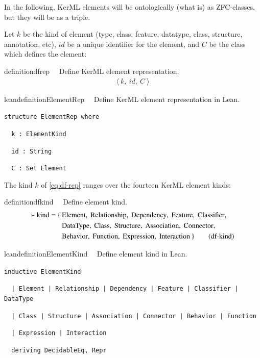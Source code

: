\pn In the following, KerML elements will be  ontologically (what is) as ZFC-classes, but they will be  as a triple.

\pn Let $k$ be the kind of element (type, class, feature, datatype, class, structure, annotation, etc), $id$ be a unique identifier for the element, and $C$ be the class which defines the element:

\begin{restatable}{definition}{dfrep}~~ Define KerML element representation.
\begin{align}
\langle~k,~id,~C~\rangle\label{eq:df-rep}\tag{df-rep}
\end{align}
\end{restatable}

\begin{restatable}{leandefinition}{ElementRep}~~ Define KerML element representation in Lean.

\texttt{\textcolor{leancolor}{structure} \textcolor{leanyellow}{ElementRep} \textcolor{leancolor}{where}}

\texttt{~~k  : ElementKind}

\texttt{~~id : String}

\texttt{~~C  : Set Element}
\label{ElementRep}
\end{restatable}

\pn The kind $k$ of \ref{eq:df-rep} ranges over the fourteen KerML element kinds:

\begin{restatable}{definition}{dfkind}~~ Define element kind.
\begin{align}
\vdash \mathrm{kind} = \{&~\mathrm{Element},~\mathrm{Relationship},~\mathrm{Dependency},~\mathrm{Feature},~\mathrm{Classifier},\notag\\
&~\mathrm{DataType},~\mathrm{Class},~\mathrm{Structure},~\mathrm{Association},~\mathrm{Connector},\notag\\
&~\mathrm{Behavior},~\mathrm{Function},~\mathrm{Expression},~\mathrm{Interaction}~\}\label{eq:df-kind}\tag{df-kind}
\end{align}
\end{restatable}

\begin{restatable}{leandefinition}{ElementKind}~~ Define element kind in Lean.

\texttt{\textcolor{leancolor}{inductive} \textcolor{leanyellow}{ElementKind}}

\texttt{~~| Element | Relationship | Dependency | Feature | Classifier | DataType}

\texttt{~~| Class | Structure | Association | Connector | Behavior | Function}

\texttt{~~| Expression | Interaction}

\texttt{~~\textcolor{leancolor}{deriving} DecidableEq, Repr}
\label{ElementKind}
\end{restatable}

